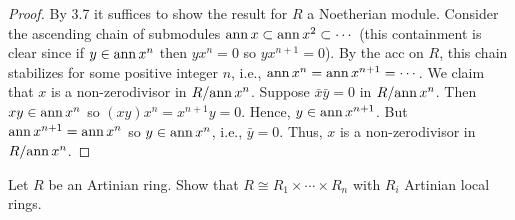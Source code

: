 \begin{proof}
By 3.7 it suffices to show the result for $R$ a Noetherian
module. Consider the ascending chain of submodules
$\operatorname{ann} x\subset\operatorname{ann} x^2\subset\cdots$ (this containment is clear
since if $y\in\operatorname{ann} x^n$ then $yx^n=0$ so $yx^{n+1}=0$). By the
acc on $R$, this chain stabilizes for some positive integer $n$,
i.e., $\operatorname{ann} x^n=\operatorname{ann} x^{n+1}=\cdots$. We claim that $x$ is a
non-zerodivisor in $R/{\operatorname{ann} x^n}$. Suppose $\bar x\bar y=0$ in
$R/{\operatorname{ann} x^n}$. Then $xy\in\operatorname{ann} x^n$ so
$(xy)x^n=x^{n+1}y=0$. Hence, $y\in\operatorname{ann} x^{n+1}$. But $\operatorname{ann}
x^{n+1}=\operatorname{ann} x^n$ so $y\in\operatorname{ann} x^n$, i.e., $\bar y=0$. Thus, $x$
is a non-zerodivisor in $R/{\operatorname{ann} x^n}$.
\end{proof}
\newpage
\begin{problem}
Let $R$ be an Artinian ring. Show that $R\cong
R_1\times\cdots\times R_n$ with $R_i$ Artinian local rings.
\end{problem}
